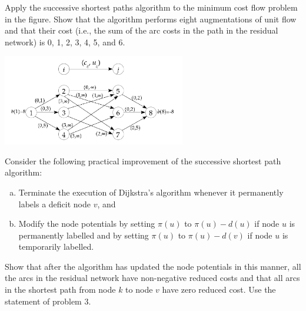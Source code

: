 \documentclass[fleqn]{homework}
\begin{document}
  \begin{problem}{5}
    \begin{question}
      Apply the successive shortest paths algorithm to the minimum cost flow
      problem in the figure. Show that the algorithm performs eight
      augmentations of unit flow and that their cost (i.e., the sum of the arc
      costs in the path in the residual network) is 0, 1, 2, 3, 4, 5, and 6.

      \includegraphics[width=0.6\textwidth]{p5-fig.png}
    \end{question}
  \end{problem}

  \begin{problem}{7}
    \begin{question}
      Consider the following practical improvement of the successive shortest
      path algorithm:

      \begin{enumerate}[a.]
      \item Terminate the execution of Dijkstra's algorithm whenever it
        permanently labels a deficit node $v$, and

      \item Modify the node potentials by setting $\pi(u)$ to $\pi(u)-d(u)$ if
        node $u$ is permanently labelled and by setting $\pi(u)$ to
        $\pi(u)-d(v)$ if node $u$ is temporarily labelled.
      \end{enumerate}

      Show that after the algorithm has updated the node potentials in this
      manner, all the arcs in the residual network have non-negative reduced
      costs and that all arcs in the shortest path from node $k$ to node $v$
      have zero reduced cost. Use the statement of problem 3.
    \end{question}
  \end{problem}
\end{document}
